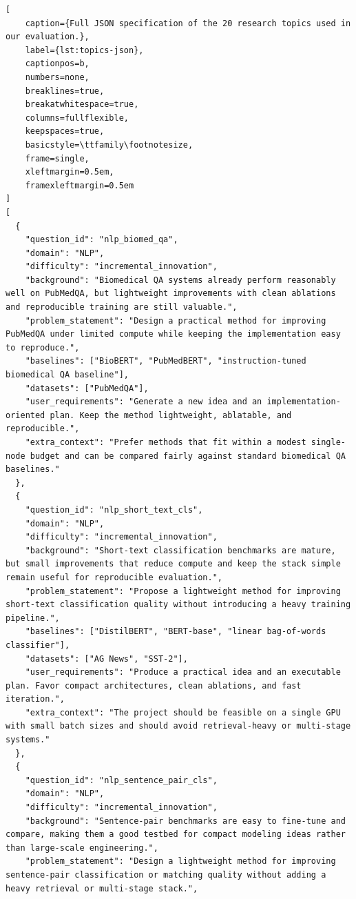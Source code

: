 \documentclass{opendatalab}
\begin{document}
\lstset{language=json}
\begin{lstlisting}[
    caption={Full JSON specification of the 20 research topics used in our evaluation.},
    label={lst:topics-json},
    captionpos=b,
    numbers=none,
    breaklines=true,
    breakatwhitespace=true,
    columns=fullflexible,
    keepspaces=true,
    basicstyle=\ttfamily\footnotesize,
    frame=single,
    xleftmargin=0.5em,
    framexleftmargin=0.5em
]
[
  {
    "question_id": "nlp_biomed_qa",
    "domain": "NLP",
    "difficulty": "incremental_innovation",
    "background": "Biomedical QA systems already perform reasonably well on PubMedQA, but lightweight improvements with clean ablations and reproducible training are still valuable.",
    "problem_statement": "Design a practical method for improving PubMedQA under limited compute while keeping the implementation easy to reproduce.",
    "baselines": ["BioBERT", "PubMedBERT", "instruction-tuned biomedical QA baseline"],
    "datasets": ["PubMedQA"],
    "user_requirements": "Generate a new idea and an implementation-oriented plan. Keep the method lightweight, ablatable, and reproducible.",
    "extra_context": "Prefer methods that fit within a modest single-node budget and can be compared fairly against standard biomedical QA baselines."
  },
  {
    "question_id": "nlp_short_text_cls",
    "domain": "NLP",
    "difficulty": "incremental_innovation",
    "background": "Short-text classification benchmarks are mature, but small improvements that reduce compute and keep the stack simple remain useful for reproducible evaluation.",
    "problem_statement": "Propose a lightweight method for improving short-text classification quality without introducing a heavy training pipeline.",
    "baselines": ["DistilBERT", "BERT-base", "linear bag-of-words classifier"],
    "datasets": ["AG News", "SST-2"],
    "user_requirements": "Produce a practical idea and an executable plan. Favor compact architectures, clean ablations, and fast iteration.",
    "extra_context": "The project should be feasible on a single GPU with small batch sizes and should avoid retrieval-heavy or multi-stage systems."
  },
  {
    "question_id": "nlp_sentence_pair_cls",
    "domain": "NLP",
    "difficulty": "incremental_innovation",
    "background": "Sentence-pair benchmarks are easy to fine-tune and compare, making them a good testbed for compact modeling ideas rather than large-scale engineering.",
    "problem_statement": "Design a lightweight method for improving sentence-pair classification or matching quality without adding a heavy retrieval or multi-stage stack.",

\end{lstlisting}
\end{document}
